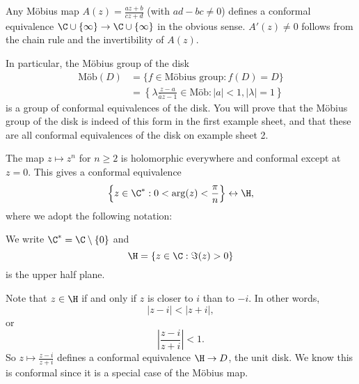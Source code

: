 \documentclass[a4paper]{article}
\begin{document}
\begin{eg}
  Any M\"obius map $A(z) = \frac{az + b}{cz + d}$ (with $ad - bc \not= 0$) defines a conformal equivalence $\C \cup \{\infty\} \to \C\cup \{\infty\}$ in the obvious sense. $A'(z) \not= 0$ follows from the chain rule and the invertibility of $A(z)$.

  In particular, the M\"obius group of the disk
  \begin{align*}
    \text{M\"ob}(D) &= \{f \in \text{M\"obius group}: f(D) = D\} \\
    &= \left\{\lambda\frac{z - a}{\bar{a}z - 1} \in \text{M\"ob} : |a| < 1, |\lambda| = 1\right\}
  \end{align*}
  is a group of conformal equivalences of the disk. You will prove that the M\"obius group of the disk is indeed of this form in the first example sheet, and that these are all conformal equivalences of the disk on example sheet 2.
\end{eg}
\begin{eg}
  The map $z \mapsto z^n$ for $n \geq 2$ is holomorphic everywhere and conformal except at $z = 0$. This gives a conformal equivalence
  \[
    \left\{z \in \C^*: 0 < \arg(z) < \frac{\pi}{n}\right\} \leftrightarrow \H,
  \]
  where we adopt the following notation:
\end{eg}

\begin{notation}
  We write $\C^* = \C \setminus \{0\}$ and
  \[
    \H = \{z \in \C: \Im (z) > 0\}
  \]
  is the upper half plane.
\end{notation}

\begin{eg}
  Note that $z \in \H$ if and only if $z$ is closer to $i$ than to $-i$. In other words,
  \[
    |z - i| < |z + i|,
  \]
  or
  \[
    \left|\frac{z - i}{z + i}\right| < 1.
  \]
  So $z \mapsto \frac{z - i}{z + i}$ defines a conformal equivalence $\H \to D$, the unit disk. We know this is conformal since it is a special case of the M\"obius map.
\end{eg}
\end{document}

